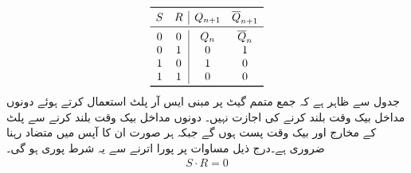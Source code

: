  \begin{align*}
 \begin{array}{cc|cc}
 \toprule
 S&R&Q_{n+1}&\overline{Q}_{n+1}\\
 \midrule
 0&0&Q_n&\overline{Q}_n\\
 0&1&0&1\\
 1&0&1&0\\
 1&1&0&0\\
 \bottomrule
 \end{array}
\end{align*}
 جدول سے ظاہر ہے کہ جمع متمم گیٹ پر مبنی ایس آر پلٹ استعمال کرتے ہوئے دونوں مداخل بیک وقت بلند کرنے کی اجازت نہیں۔ دونوں مداخل بیک وقت بلند کرنے سے پلٹ کے مخارج  اور  بیک وقت پست ہوں گے جبکہ ہر صورت ان کا آپس میں متضاد رہنا ضروری ہے۔درج ذیل مساوات پر پورا اترنے سے یہ شرط پوری ہو گی۔
 \begin{align}
 S\cdot R=0
 \end{align}
%
